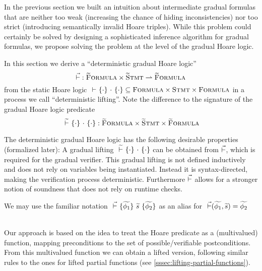 %
%
%
%

In the previous section we built an intuition about intermediate gradual formulas that are neither too weak (increasing the chance of hiding inconsistencies) nor too strict (introducing semantically invalid Hoare triples).
While this problem could certainly be solved by designing a sophisticated inference algorithm for gradual formulas, we propose solving the problem at the level of the gradual Hoare logic.

In this section we derive a “deterministic gradual Hoare logic” 
$$\vec{\vdash} : \textup{\textsc{\ensuremath{\widetilde{\text{F}}}ormula}} \times \textup{\textsc{\ensuremath{\widetilde{\text{S}}}tmt}} \rightharpoonup \textup{\textsc{\ensuremath{\widetilde{\text{F}}}ormula}}$$
from the static Hoare logic ${} \,\,{\vdash}\,\, \{{\cdot}\} ~{\cdot}~ \{{\cdot}\} \subseteq \textup{\textsc{Formula}} \times \textup{\textsc{Stmt}} \times \textup{\textsc{Formula}}$ in a process we call “deterministic lifting”.
Note the difference to the signature of the gradual Hoare logic predicate
$${} \,\,\widetilde{\vdash}\,\, \{{\cdot}\} ~{\cdot}~ \{{\cdot}\} : \textup{\textsc{\ensuremath{\widetilde{\text{F}}}ormula}} \times \textup{\textsc{\ensuremath{\widetilde{\text{S}}}tmt}} \times \textup{\textsc{\ensuremath{\widetilde{\text{F}}}ormula}}$$

The deterministic gradual Hoare logic has the following desirable properties (formalized later):
A gradual lifting ${} \,\,\widetilde{\vdash}\,\, \{{\cdot}\} ~{\cdot}~ \{{\cdot}\}$ can be obtained from $\vec{\vdash}$, which is required for the gradual verifier.
This gradual lifting is not defined inductively and does not rely on variables being instantiated.
Instead it is syntax-directed, making the verification process deterministic.
Furthermore $\vec{\vdash}$ allows for a stronger notion of soundness that does not rely on runtime checks.

We may use the familiar notation ${} \,\,\vec{\vdash}\,\, \{{\widetilde{\phi_1}}\} ~{\widetilde{s}}~ \{{\widetilde{\phi_2}}\}$ as an alias for $~\vec{\vdash}(\widetilde{\phi_1}, \widetilde{s}) = \widetilde{\phi_2}$

~\\
Our approach is based on the idea to treat the Hoare predicate as a (multivalued) function, mapping preconditions to the set of possible/verifiable postconditions.
From this multivalued function we can obtain a lifted version, following similar rules to the ones for lifted partial functions (see \ref{sssec:lifting-partial-functions}).


